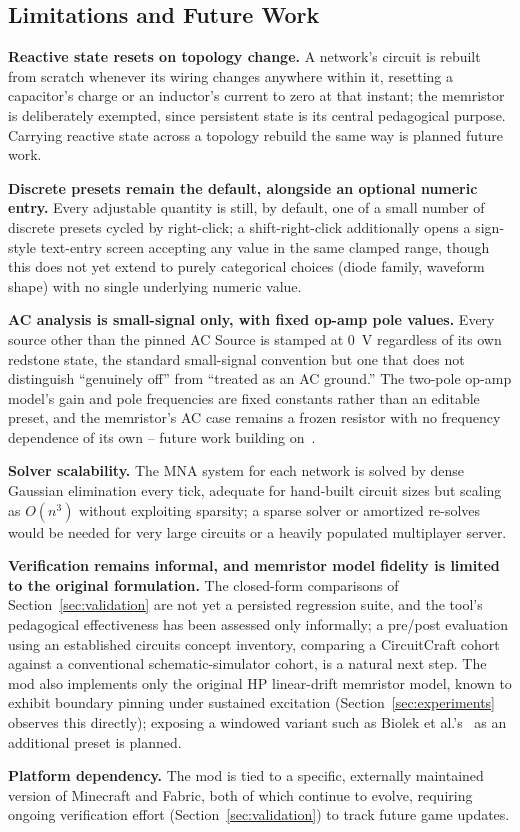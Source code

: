\subsection{Limitations and Future Work}
\label{sec:limitations}

\textbf{Reactive state resets on topology change.} A network's circuit is rebuilt from
scratch whenever its wiring changes anywhere within it, resetting a capacitor's charge or an
inductor's current to zero at that instant; the memristor is deliberately exempted, since
persistent state is its central pedagogical purpose. Carrying reactive state across a
topology rebuild the same way is planned future work.

\textbf{Discrete presets remain the default, alongside an optional numeric entry.} Every
adjustable quantity is still, by default, one of a small number of discrete presets cycled by
right-click; a shift-right-click additionally opens a sign-style text-entry screen accepting
any value in the same clamped range, though this does not yet extend to purely categorical
choices (diode family, waveform shape) with no single underlying numeric value.

\textbf{AC analysis is small-signal only, with fixed op-amp pole values.} Every source other
than the pinned AC Source is stamped at 0~V regardless of its own redstone state, the
standard small-signal convention but one that does not distinguish ``genuinely off'' from
``treated as an AC ground.'' The two-pole op-amp model's gain and pole frequencies are fixed
constants rather than an editable preset, and the memristor's AC case remains a frozen
resistor with no frequency dependence of its own -- future work building
on~\cite{gater2026smallsignal,gater2025bodeplots}.

\textbf{Solver scalability.} The MNA system for each network is solved by dense Gaussian
elimination every tick, adequate for hand-built circuit sizes but scaling as $O(n^3)$ without
exploiting sparsity; a sparse solver or amortized re-solves would be needed for very large
circuits or a heavily populated multiplayer server.

\textbf{Verification remains informal, and memristor model fidelity is limited to the
original formulation.} The closed-form comparisons of Section~\ref{sec:validation} are not
yet a persisted regression suite, and the tool's pedagogical effectiveness has been assessed
only informally; a pre/post evaluation using an established circuits concept inventory,
comparing a CircuitCraft cohort against a conventional schematic-simulator cohort, is a
natural next step. The mod also implements only the original HP linear-drift memristor model,
known to exhibit boundary pinning under sustained excitation (Section~\ref{sec:experiments}
observes this directly); exposing a windowed variant such as Biolek et al.'s~\cite{biolek2009spice}
as an additional preset is planned.

\textbf{Platform dependency.} The mod is tied to a specific, externally maintained version of
Minecraft and Fabric, both of which continue to evolve, requiring ongoing verification effort
(Section~\ref{sec:validation}) to track future game updates.
